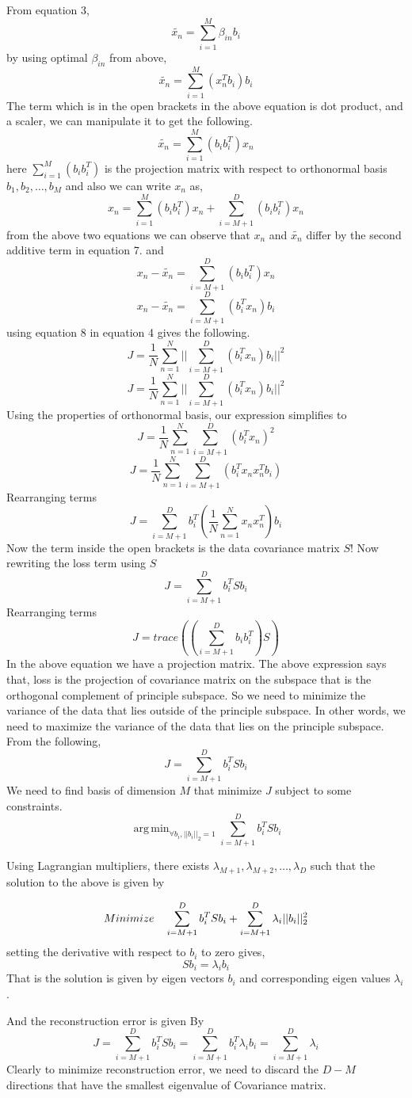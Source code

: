 \documentclass[11pt]{article}
\DeclareMathOperator*{\argmin}{arg\,min}
\begin{document}
From equation 3, 
$$\tilde{x_n} = \sum_{i=1}^{M}\beta_{in}b_i    $$
by using optimal $\beta_{in}$ from above,
$$ \tilde{x_n} = \sum_{i=1}^{M}(x_n^Tb_i)b_i  $$
The term which is in the open brackets in the above equation is dot product, and a scaler, we can manipulate it to get the following.
\begin{equation}
     \tilde{x_n} = \sum_{i=1}^{M}(b_ib_i^T)x_n 
\end{equation}
here $\sum_{i=1}^{M}(b_ib_i^T)$ is the projection matrix with respect to orthonormal basis $b_1, b_2, \dots, b_M$
and also we can write $x_n$ as,
\begin{equation}
    x_n = \sum_{i=1}^{M}(b_ib_i^T)x_n + \sum_{i=M+1}^{D}(b_ib_i^T)x_n
\end{equation}
from the above two equations we can observe that $x_n$ and $\tilde{x_n}$ differ by the second additive term in equation 7.
and
$$x_n-\tilde{x_n} = \sum_{i=M+1}^{D}(b_ib_i^T)x_n $$
\begin{equation}
    x_n-\tilde{x_n} = \sum_{i=M+1}^{D}(b_i^Tx_n)b_i    
\end{equation}
using equation 8 in equation 4 gives the following.
$$ J = \frac{1}{N} \sum_{n=1}^{N} ||\sum_{i=M+1}^{D}(b_i^Tx_n)b_i||^2 $$
$$ J = \frac{1}{N} \sum_{n=1}^{N} ||\sum_{i=M+1}^{D}(b_i^Tx_n)b_i||^2 $$
Using the properties of orthonormal basis, our expression simplifies to 
$$ J = \frac{1}{N} \sum_{n=1}^{N}\sum_{i=M+1}^{D}(b_i^Tx_n)^2 $$
$$ J = \frac{1}{N} \sum_{n=1}^{N}\sum_{i=M+1}^{D}(b_i^Tx_nx_n^Tb_i) $$
Rearranging terms
$$ J = \sum_{i=M+1}^{D} b_i^T (\frac{1}{N} \sum_{n=1}^{N} x_nx_n^T) b_i$$
Now the term inside the open brackets is the data covariance matrix $S$!
Now rewriting the loss term using $S$
$$ J = \sum_{i=M+1}^{D} b_i^T S b_i$$
Rearranging terms 
$$ J = trace((\sum_{i=M+1}^{D} b_i b_i^T) S )$$
In the above equation we have a projection matrix. The above expression says that, loss is the projection of covariance matrix on the subspace that is the orthogonal complement of 
principle subspace. So we need to minimize the variance of the data that lies outside of the principle subspace. In other words, we need to maximize the variance of the data that lies on the principle subspace.
From the following,
$$ J = \sum_{i=M+1}^{D} b_i^T S b_i$$
We need to find basis of dimension $M$ that minimize $J$ subject to some constraints.
$$\argmin_{\forall b_i, ||b_i||_2=1} \sum_{i=M+1}^{D} b_i^T S b_i$$

Using Lagrangian multipliers, there exists $\lambda_{M+1},\lambda_{M+2},\dots,\lambda_{D}$ such that the solution to the above is given by

$$Minimize \hspace{10px} \sum_{i=M+1}^{D} b_i^T S b_i + \sum_{i=M+1}^{D} \lambda_i ||b_i||_2^2 $$
setting the derivative with respect to $b_i$ to zero gives,
$$Sb_i = \lambda_i b_i$$
That is the solution is given by eigen vectors $b_i$ and corresponding eigen values $\lambda_i$.

And the reconstruction error is given By
$$ J = \sum_{i=M+1}^{D} b_i^T S b_i = \sum_{i=M+1}^{D} b_i^T \lambda_i b_i = \sum_{i=M+1}^{D} \lambda_i$$
Clearly to minimize reconstruction error, we need to discard the $D-M$ directions that have the smallest eigenvalue of 
Covariance matrix.
\end{document}

